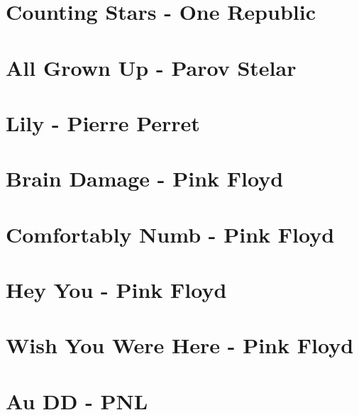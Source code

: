 \documentclass[11pt]{article}
\begin{document}
\section{Counting Stars - One Republic}
\begin{guitar}

\end{guitar}

\section{All Grown Up - Parov Stelar}
\begin{guitar}

\end{guitar}


\section{Lily - Pierre Perret}


\section{Brain Damage - Pink Floyd}



\section{Comfortably Numb - Pink Floyd}
\begin{guitar}

\end{guitar}


\section{Hey You - Pink Floyd}




\section{Wish You Were Here - Pink Floyd}
\begin{guitar}

\end{guitar}


\section{Au DD - PNL}

\end{document}
